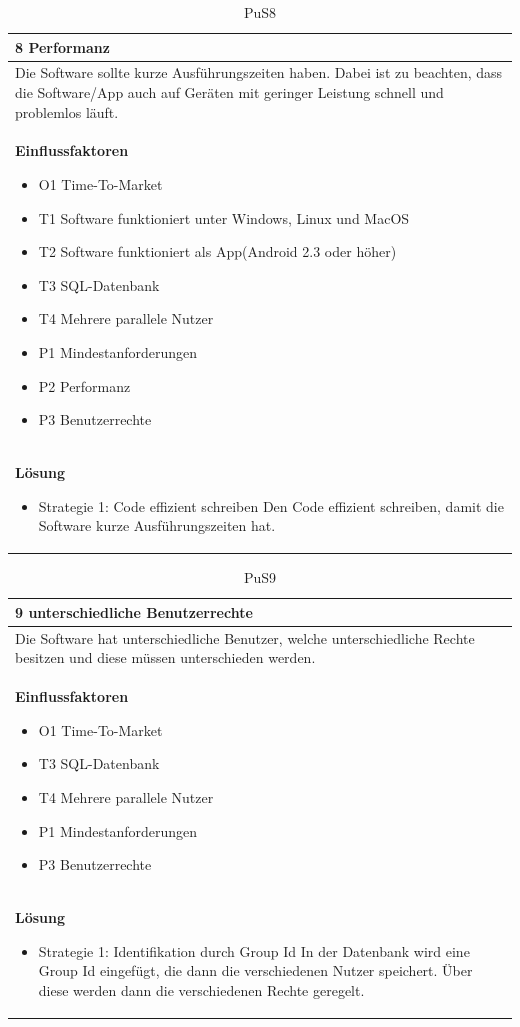 \documentclass[fontsize=12pt,paper=a4,twoside]{scrartcl}
\begin{document}
\begin{table}[H]
\caption{PuS8}
\begin{tabular}{|p{\textwidth}|}\hline
8 Performanz\\ \hline
Die Software sollte kurze Ausführungszeiten haben. Dabei ist zu beachten, dass die Software/App auch auf Geräten mit geringer Leistung schnell und problemlos läuft.\\ \hline
\textbf{Einflussfaktoren}
\begin{itemize}
\item O1 Time-To-Market
\item T1 Software funktioniert unter Windows, Linux und MacOS
\item T2 Software funktioniert als App(Android 2.3 oder höher)
\item T3 SQL-Datenbank
\item T4 Mehrere parallele Nutzer
\item P1 Mindestanforderungen
\item P2 Performanz
\item P3 Benutzerrechte
\end{itemize}\\ \hline
\textbf{Lösung}
\begin{itemize}
\item Strategie 1: Code effizient schreiben \leavevmode\newline
Den Code effizient schreiben, damit die Software kurze Ausführungszeiten hat.
\end{itemize}\\ \hline
\end{tabular}
\end{table}

\begin{table}[H]
\caption{PuS9}
\begin{tabular}{|p{\textwidth}|}\hline
9 unterschiedliche Benutzerrechte\\ \hline
Die Software hat unterschiedliche Benutzer, welche unterschiedliche Rechte besitzen und diese müssen unterschieden werden.\\ \hline
\textbf{Einflussfaktoren}
\begin{itemize}
\item O1 Time-To-Market
\item T3 SQL-Datenbank
\item T4 Mehrere parallele Nutzer
\item P1 Mindestanforderungen
\item P3 Benutzerrechte
\end{itemize}\\ \hline
\textbf{Lösung}
\begin{itemize}
\item Strategie 1: Identifikation durch Group Id \leavevmode\newline
In der Datenbank wird eine Group Id eingefügt, die dann die verschiedenen Nutzer speichert. Über diese werden dann die verschiedenen Rechte geregelt.
\end{itemize} \\ \hline
\end{tabular}
\end{table}
\end{document}
